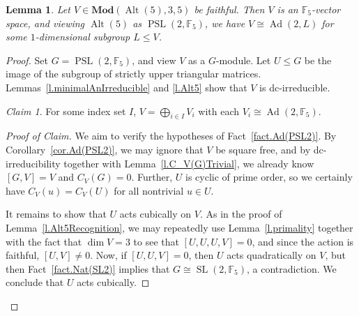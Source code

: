\documentclass[a4paper, 11pt]{amsart}
\theoremstyle{plain}
\newtheorem{lemma}[theorem]{Lemma}
\theoremstyle{definition}
\theoremstyle{remark}
\newtheorem{claim}{Claim}
\newenvironment{proofclaim}[1][Proof of Claim]{\begin{proof}[#1]\renewcommand{\qedsymbol}{$\lozenge$}}{\end{proof}}
\DeclareMathOperator{\Alt}{Alt}
\DeclareMathOperator{\PSL}{PSL}
\DeclareMathOperator{\SL}{SL}
\DeclareMathOperator{\Ad}{Ad}
\newcommand{\Mod}{\mathbf{Mod}}
\newcommand{\bF}{\mathbb{F}}
\begin{document}
\begin{lemma}\label{l.Alt5RecognitionDim3Char5}
    Let $V\in \Mod(\Alt(5),3,5)$ be faithful. Then $V$ is an $\bF_5$-vector space, and viewing $\Alt(5)$ as $\PSL(2,\bF_5)$, we have $V\cong \Ad(2, L)$ for some $1$-dimensional subgroup $L\le V$.
\end{lemma}
\begin{proof}
Set $G =  \PSL(2,\bF_5)$, and view $V$ as a $G$-module. Let $U\le G$ be the image of the subgroup of strictly upper triangular matrices. Lemmas~\ref{l.minimalAnIrreducible} and \ref{l.Alt5} show that $V$ is dc-irreducible.

\begin{claim}
For some index set $I$, $V= \bigoplus_{i\in I} V_i$ with each $V_i \cong \Ad(2,\bF_5)$.
\end{claim}
\begin{proofclaim}
We aim to verify the hypotheses of Fact~\ref{fact.Ad(PSL2)}. By  Corollary~\ref{cor.Ad(PSL2)}, we may ignore that $V$ be square free, and 
by dc-irreducibility together with Lemma~\ref{l.C_V(G)Trivial}, we already know $[G,V] = V$ and $C_V(G) = 0$. Further, $U$ is cyclic of prime order, so we certainly have $C_V(u) = C_V(U)$ for all nontrivial $u\in U$. 

It remains to show that $U$ acts cubically on $V$.  As in the proof of Lemma~\ref{l.Alt5Recognition}, we may repeatedly use Lemma~\ref{l.primality} together with the fact that $\dim V = 3$ to see that $[U,U,U,V] = 0$, and since the action is faithful, $[U,V] \neq 0$. Now, if $[U,U,V] = 0$, then $U$ acts quadratically on $V$, but then Fact~\ref{fact.Nat(SL2)} implies that $G \cong \SL(2,\bF_5)$, a contradiction. We conclude that $U$ acts cubically.
\end{proofclaim}


\end{proof}
\end{document}
